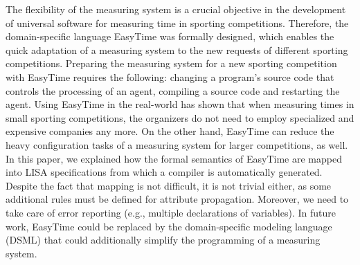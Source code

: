 \documentclass[preprint, prX]{revtex4}
\begin{document}
The flexibility of the measuring system is a crucial objective in the development of universal software for measuring time in sporting
competitions. Therefore, the domain-specific language EasyTime was formally designed, which enables the quick adaptation of a measuring
system to the new requests of different sporting competitions. Preparing the measuring system for a new sporting competition with EasyTime requires the following: changing a program's source code that controls the processing of an agent, compiling a source code and restarting the agent. Using EasyTime in the real-world has shown that when measuring times in small sporting competitions, the organizers do not need to employ specialized and expensive companies any more. On the other hand, EasyTime can reduce the heavy configuration tasks of a measuring system for larger competitions, as well. In this paper, we explained how the formal semantics of EasyTime are mapped into LISA specifications from which a compiler is automatically generated. Despite the fact that mapping is not difficult, it is not trivial either, as some additional rules must be defined for attribute propagation. Moreover, we need to take care of error reporting (e.g., multiple declarations of variables).
In future work, EasyTime could be replaced by the domain-specific modeling language (DSML) \cite{Sprinkle:2009,Stuikys:2010,Vitiutinas:2011} that could additionally simplify the programming of a measuring system.
\end{document}

